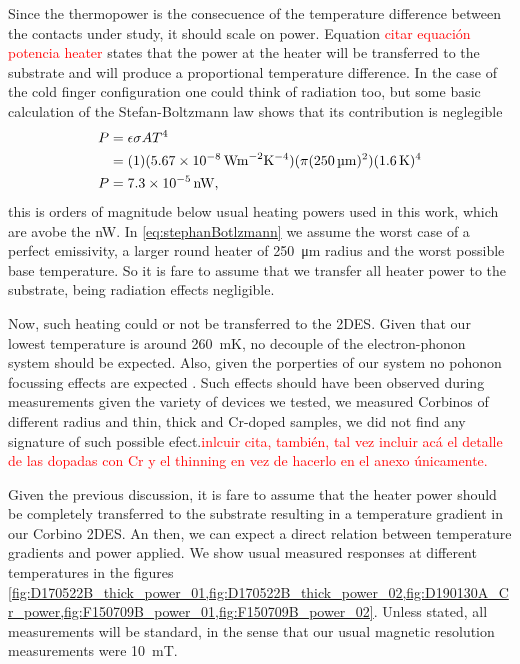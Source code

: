 Since the thermopower is the consecuence of the temperature difference between the contacts under study, it should scale on power. 
Equation \textcolor{red}{citar equación potencia heater} states that the power at the heater will be transferred to the substrate and will produce a proportional temperature difference. In the case of the cold finger configuration one could think of radiation too, but some basic calculation of the Stefan-Boltzmann law shows that its contribution is neglegible 
\begin{equation} 
    \label{eq:stephanBotlzmann}
    \begin{split}
        P   &= \epsilon \sigma A T^4 \\
            &= (1) (\SI{5.67e{-8}}{\watt \metre^{-2} \kelvin^{-4}})(\pi(\SI{250}{\micro\meter})^2 ) (\SI{1.6}{\kelvin})^4 \\
        P   &= \SI{7.3e-5}{\nano\watt},
    \end{split}
\end{equation}
this is orders of magnitude below usual heating powers used in this work, which are avobe the \unit{\nano\watt}. In \ref{eq:stephanBotlzmann} we assume the worst case of a perfect emissivity, a larger round heater of \SI{250}{\micro\meter} radius and the worst possible base temperature.
So it is fare to assume that we transfer all heater power to the substrate, being radiation effects negligible. 

Now, such heating could or not be transferred to the 2DES. Given that our lowest temperature is around \SI{260}{\milli\kelvin}, no decouple of the electron-phonon system should be expected. Also, given the porperties of our system no pohonon focussing effects are expected \cite{anderson2012phonon,ramsbey1988phonon,karl1988imaging}. Such effects should have been observed during measurements given the variety of devices we tested, we measured Corbinos of different radius and thin, thick and Cr-doped samples, we did not find any signature of such possible efect.\textcolor{red}{inlcuir cita, también, tal vez incluir acá el detalle de las dopadas con Cr y el thinning en vez de hacerlo en el anexo únicamente.} 

Given the previous discussion, it is fare to assume that the heater power should be completely transferred to the substrate resulting in a temperature gradient in our Corbino 2DES. An then, we can expect a direct relation between temperature gradients and power applied. We show usual measured responses at different temperatures in the figures \ref{fig:D170522B_thick_power_01,fig:D170522B_thick_power_02,fig:D190130A_Cr_power,fig:F150709B_power_01,fig:F150709B_power_02}. Unless stated, all measurements will be standard, in the sense that our usual magnetic resolution measurements were \SI{10}{\milli\tesla}.

